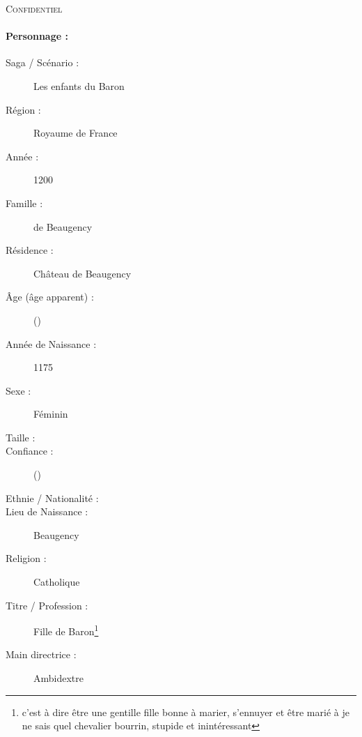 \pagestyle{fancy}
\thispagestyle{plain}
\begin{center}
\textsc{\Large\color{red}Confidentiel}
\end{center}
{\Large \paragraph*{\Large Personnage :} \magusname}
\begin{multicols}{2}
\begin{description}
\item[Saga / Scénario :] Les enfants du Baron
\item[Région :] Royaume de France
\item[Année :] 1200
\item[Famille :] de Beaugency
\item[Résidence :] Château de Beaugency
\item[Âge (âge apparent) :] \magusage{} (\magusapparentage)
\item[Année de Naissance :] 1175
\item[Sexe :] Féminin
\item[Taille :] \magussize
\item[Confiance :] \magusconfidencescore{} (\magusconfidencepts)
\columnbreak
\item[Ethnie /  Nationalité :]
\item[Lieu de Naissance :] Beaugency
\item[Religion :] Catholique
\item[Titre / Profession :] Fille de Baron\footnote{c'est à dire être une gentille fille bonne à marier, s'ennuyer et être marié à je ne sais quel chevalier bourrin, stupide et inintéressant}
\item[Main directrice :] Ambidextre
\vspace{-1em}
\end{description}
\end{multicols}
